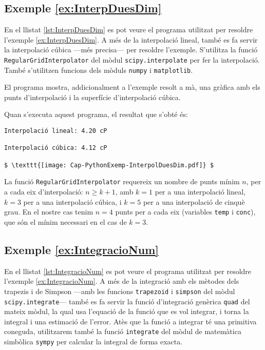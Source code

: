 \hypertarget{exemple:InterpDuesDim}{\subsection{Exemple \ref*{ex:InterpDuesDim} \InterpDuesDim}}
En el llistat \vref{lst:InterpDuesDim} es pot veure el programa utilitzat per resoldre l'exemple \vref{ex:InterpDuesDim}. A més de la interpolació lineal, també es fa servir la interpolació cúbica ---més precisa--- per resoldre l'exemple. S'utilitza la funció \texttt{RegularGridInterpolator} del mòdul \texttt{scipy.interpolate} per fer la interpolació. També s'utilitzen funcions dels mòduls \texttt{numpy} i  \texttt{matplotlib}.


El programa mostra, addicionalment a l'exemple resolt a mà, una gràfica amb els punts d'interpolació i la superfície d'interpolació cúbica.

Quan s'executa aquest programa, el resultat que s'obté és:
\lstset{
	language=,
	numbers=none,
	frame=none
}
\begin{lstlisting}[mathescape=true]
Interpolació lineal: 4.20 cP

Interpolació cúbica: 4.12 cP

$ \texttt{[image: Cap-PythonExemp-InterpolDuesDim.pdf]} $
\end{lstlisting} 


La  funció  \texttt{RegularGridInterpolator} requereix un nombre de punts  mínim $n$, per a cada eix d'interpolació: $n \geq k+1$, amb $k=1$ per a una interpolació lineal, $k=3$ per a una interpolació cúbica, i $k=5$ per a una interpolació de cinquè grau. En el nostre cas tenim $n=4$ punts per a cada eix (variables \texttt{temp} i \texttt{conc}), que són el mínim necessari en el cas de $k=3$.

\hypertarget{exemple:IntegracioNum}{\subsection{Exemple \ref*{ex:IntegracioNum} \IntegracioNum}}
En el llistat \vref{lst:IntegracioNum} es pot veure el programa utilitzat per resoldre l'exemple \vref{ex:IntegracioNum}. A més de la integració amb els  mètodes dels trapezis i de Simpson ---amb les funcions \texttt{trapezoid} i \texttt{simpson} del mòdul \texttt{scipy.integrate}--- també es fa servir la funció  d'integració genèrica \texttt{quad} del mateix mòdul,  la qual usa l'equació de la funció que es vol integrar, i torna la integral i una estimació de l'error. Atès que la funció a integrar té una primitiva coneguda, utilitzarem també la funció \texttt{integrate} del mòdul de matemàtica simbòlica \texttt{sympy} per calcular la integral de forma exacta.


